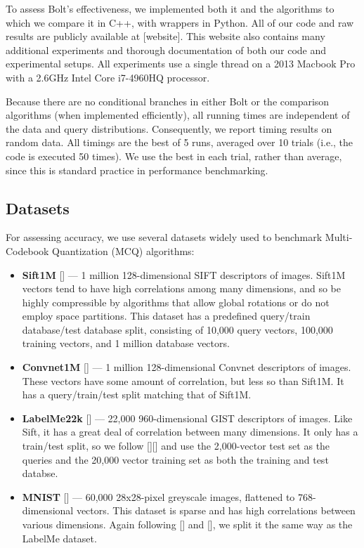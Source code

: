 
To assess Bolt's effectiveness, we implemented both it and the algorithms to which we compare it in C++, with wrappers in Python. All of our code and raw results are publicly available at [website]. This website also contains many additional experiments and thorough documentation of both our code and experimental setups. All experiments use a single thread on a 2013 Macbook Pro with a 2.6GHz Intel Core i7-4960HQ processor. %

Because there are no conditional branches in either Bolt or the comparison algorithms (when implemented efficiently), all running times are independent of the data and query distributions. Consequently, we report timing results on random data. All timings are the best of 5 runs, averaged over 10 trials (i.e., the code is executed 50 times). We use the best in each trial, rather than average, since this is standard practice in performance benchmarking.

\subsection{Datasets}

For assessing accuracy, we use several datasets widely used to benchmark Multi-Codebook Quantization (MCQ) algorithms:
\begin{itemize}
\item \textbf{Sift1M} [] --- 1 million 128-dimensional SIFT descriptors of images. Sift1M vectors tend to have high correlations among many dimensions, and so be highly compressible by algorithms that allow global rotations or do not employ space partitions. This dataset has a predefined query/train database/test database split, consisting of 10,000 query vectors, 100,000 training vectors, and 1 million database vectors.
\item \textbf{Convnet1M} [] --- 1 million 128-dimensional Convnet descriptors of images. These vectors have some amount of correlation, but less so than Sift1M. It has a query/train/test split matching that of Sift1M.
\item \textbf{LabelMe22k} [] --- 22,000 960-dimensional GIST descriptors of images. Like Sift, it has a great deal of correlation between many dimensions. It only has a train/test split, so we follow [][] and use the 2,000-vector test set as the queries and the 20,000 vector training set as both the training and test databse.
\item \textbf{MNIST} [] --- 60,000 28x28-pixel greyscale images, flattened to 768-dimensional vectors. This dataset is sparse and has high correlations between various dimensions. Again following [] and [], we split it the same way as the LabelMe dataset.
\end{itemize}


